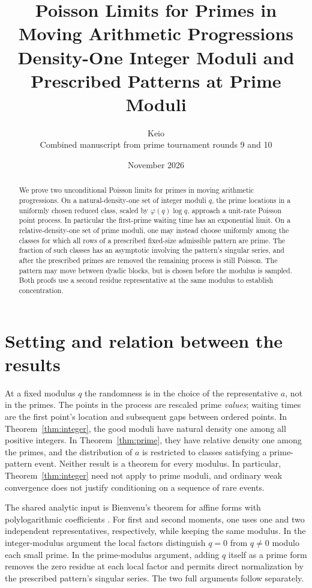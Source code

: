 \documentclass[11pt]{article}
\title{Poisson Limits for Primes in Moving Arithmetic Progressions\\
\large Density-One Integer Moduli and Prescribed Patterns at Prime Moduli}
\author{Keio\\\small Combined manuscript from prime tournament rounds 9 and 10}
\date{November 2026}
\newcommand{\1}{\mathbf{1}}
\begin{document}
\maketitle
\begin{abstract}
We prove two unconditional Poisson limits for primes in moving
arithmetic progressions. On a natural-density-one set of integer moduli
$q$, the prime locations in a uniformly chosen reduced class, scaled
by $\varphi(q)\log q$, approach a unit-rate Poisson point process.
In particular the first-prime waiting time has an exponential limit.
On a relative-density-one set of prime moduli, one may instead choose
uniformly among the classes for which all rows of a prescribed
fixed-size admissible pattern are prime. The fraction of such classes
has an asymptotic involving the pattern's singular series, and after
the prescribed primes are removed the remaining process is still
Poisson. The pattern may move between dyadic blocks, but is chosen
before the modulus is sampled. Both proofs use a second residue
representative at the same modulus to establish concentration.
\end{abstract}

\section{Setting and relation between the results}
At a fixed modulus $q$ the randomness is in the choice of the
representative $a$, not in the primes. The points in the process are
rescaled prime \emph{values}; waiting times are the first point's
location and subsequent gaps between ordered points. In
Theorem~\ref{thm:integer}, the good moduli have natural density one
among all positive integers. In Theorem~\ref{thm:prime}, they have
relative density one among the primes, and the distribution of $a$ is
restricted to classes satisfying a prime-pattern event. Neither
result is a theorem for every modulus. In particular,
Theorem~\ref{thm:integer} need not apply to prime moduli, and ordinary
weak convergence does not justify conditioning on a sequence of rare
events.

The shared analytic input is Bienvenu's theorem for affine forms with
polylogarithmic coefficients \cite{bien}. For first and second moments,
one uses one and two independent representatives, respectively, while
keeping the same modulus. In the integer-modulus argument the local
factors distinguish $q=0$ from $q\ne0$ modulo each small prime. In the
prime-modulus argument, adding $q$ itself as a prime form removes the
zero residue at each local factor and permits direct normalization by
the prescribed pattern's singular series. The two full arguments
follow separately.
\end{document}
